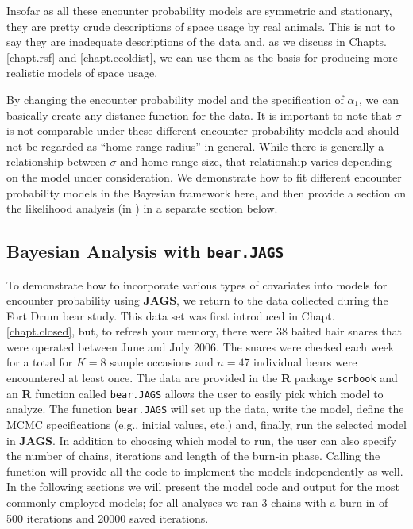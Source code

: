Insofar as all these encounter probability models
are symmetric and stationary, they are pretty
crude descriptions of space usage by real animals. This is not to
say they are inadequate descriptions of the data and, as we discuss in
Chapts. \ref{chapt.rsf} and \ref{chapt.ecoldist}, we can use them as the
basis for producing more realistic models of space usage.  

By changing the encounter probability model
and the specification of
$\alpha_1$, we can basically create any distance function for the
data. It is important to note that $\sigma$ is not comparable under
these different encounter probability models
and should not be
regarded as ``home range radius'' in general.  While there is
generally a relationship between $\sigma$ and home range size, that
relationship varies depending on the model under consideration. We
demonstrate how to fit different encounter probability models
 in the Bayesian
framework here, and then provide a section on the likelihood analysis
(in \secr) in a separate section below.

\subsection{Bayesian Analysis with {\tt bear.JAGS}}

To demonstrate how to incorporate various types of covariates into
models for encounter probability using {\bf JAGS}, we return to the
data collected during the Fort Drum bear study.  This data set was first
introduced in Chapt. \ref{chapt.closed}, but, to refresh your memory,
there were 38 baited hair snares that were operated between June and
July 2006.  The snares were checked each week for a total for $K=8$
sample occasions and $n=47$ individual bears were encountered at least
once.  The data are provided in the {\bf R} package \mbox{\tt scrbook}
and an {\bf R} function called {\tt bear.JAGS} allows the user to
easily pick which model to analyze.  The function {\tt bear.JAGS} will
set up the data, write the model, define the MCMC specifications
(e.g., initial values, etc.) and, finally, run the selected model in
{\bf JAGS}. In addition to choosing which model to run, the user can
also specify the number of chains, iterations and length of the
burn-in phase. Calling the function will provide all the code to
implement the models independently as well.  In the following sections
we will present the model code and output for the most commonly
employed models; for all analyses we ran 3 chains with a burn-in of
500 iterations and 20000 saved iterations.


